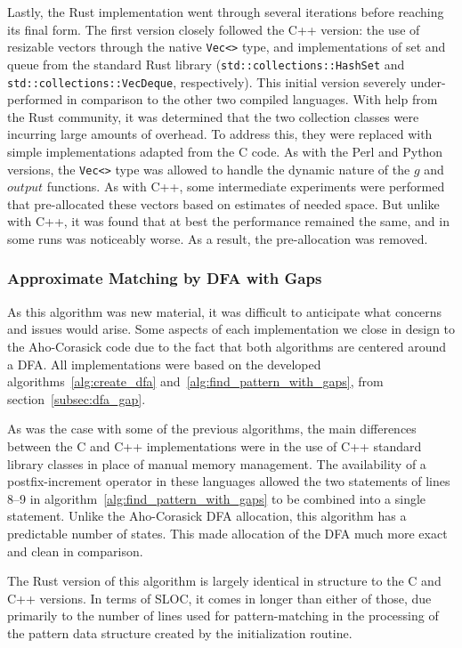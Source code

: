 Lastly, the Rust implementation went through several iterations before reaching its final form. The first version closely followed the C++ version: the use of resizable vectors through the native \texttt{Vec<>} type, and implementations of set and queue from the standard Rust library (\texttt{std::collections::HashSet} and \texttt{std::collections::VecDeque}, respectively). This initial version severely under-performed in comparison to the other two compiled languages. With help from the Rust community, it was determined that the two collection classes were incurring large amounts of overhead. To address this, they were replaced with simple implementations adapted from the C code. As with the Perl and Python versions, the \texttt{Vec<>} type was allowed to handle the dynamic nature of the $g$ and $output$ functions. As with C++, some intermediate experiments were performed that pre-allocated these vectors based on estimates of needed space. But unlike with C++, it was found that at best the performance remained the same, and in some runs was noticeably worse. As a result, the pre-allocation was removed.

\subsubsection{Approximate Matching by DFA with Gaps}

As this algorithm was new material, it was difficult to anticipate what concerns and issues would arise. Some aspects of each implementation we close in design to the Aho-Corasick code due to the fact that both algorithms are centered around a DFA. All implementations were based on the developed algorithms~\ref{alg:create_dfa} and~\ref{alg:find_pattern_with_gaps}, from section~\ref{subsec:dfa_gap}.

As was the case with some of the previous algorithms, the main differences between the C and C++ implementations were in the use of C++ standard library classes in place of manual memory management. The availability of a postfix-increment operator in these languages allowed the two statements of lines 8--9 in algorithm~\ref{alg:find_pattern_with_gaps} to be combined into a single statement. Unlike the Aho-Corasick DFA allocation, this algorithm has a predictable number of states. This made allocation of the DFA much more exact and clean in comparison.

The Rust version of this algorithm is largely identical in structure to the C and C++ versions. In terms of SLOC, it comes in longer than either of those, due primarily to the number of lines used for pattern-matching in the processing of the pattern data structure created by the initialization routine.

